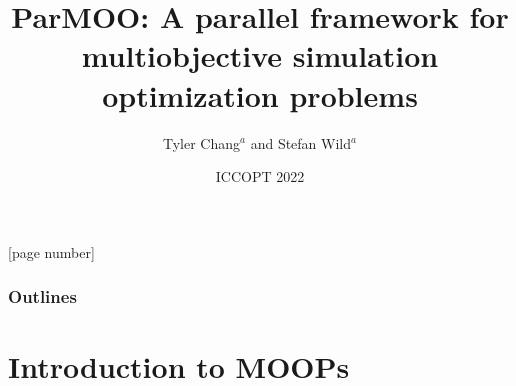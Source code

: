 \documentclass[aspectratio=169]{beamer}
\title{ParMOO: A parallel framework for multiobjective simulation optimization problems}
\author{Tyler Chang$^a$ and Stefan Wild$^a$}
\institute{$^a$Mathematics and Computer Science Division,\\
Argonne National Laboratory}
\date{ICCOPT 2022}
\begin{document}
{
\frame{\titlepage}
}
[page number]{}

\begin{frame}
  \frametitle{Outlines}
  \tableofcontents
\end{frame}


\section{Introduction to MOOPs}
\end{document}
